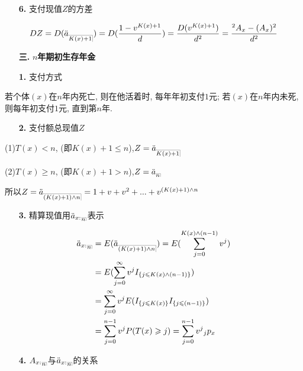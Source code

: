 \documentclass[a4paper,10pt]{ctexbook}
\makeatletter
\newcommand{\hei}{\CJKfamily{hei}}      %
\DeclareRobustCommand{\annu}[1]{_{%
    \def\arraystretch{0}%
    \setlength\arraycolsep{1pt}%
    \setlength\arrayrulewidth{.2pt}%
    \begin{array}[b]{@{}c|}\hline
        \\[\arraycolsep]%
        \scriptstyle #1%
    \end{array}%
}}
\makeatother
\begin{document}
\begin{itemize}
    \item[{\bf\hei 6.}]支付现值$Z$的方差
\end{itemize}

\begin{align*}
    DZ=D(\ddot a_{\annu {K(x)+1}})=D(\frac{1-v^{K(x)+1}}{d})=\frac{D(v^{K(x)+1})}{d^2}=\frac{{}^2A_x-(A_x)^2}{d^2}
\end{align*}

\begin{itemize}
    \item[{\bf\hei 三.}]{\bf\hei $n$年期初生存年金}
\end{itemize}

\begin{itemize}
    \item[{\bf\hei 1.}]支付方式
\end{itemize}

若个体$(x)$在$n$年内死亡, 则在他活着时, 每年年初支付$1$元; 若$(x)$在$n$年内未死, 则每年初支付$1$元, 直到第$n$年.

\begin{itemize}
    \item[{\bf\hei 2.}]支付额总现值$Z$
\end{itemize}

(1)$T(x)<n$, (即$K(x)+1\leqslant n$),$Z=\ddot a_{\annu {K(x)+1}}$

(2)$T(x)\geqslant n$, (即$K(x)+1>n$),$Z=\ddot a_{\annu {n}}$

所以$Z=\ddot a_{\annu {(K(x)+1)\land n}}=1+v+v^2+...+v^{(K(x)+1)\land n}$
\begin{itemize}
    \item[{\bf\hei 3.}]精算现值用$\ddot a_{x:}{}_{\annu n}$表示
\end{itemize}
\begin{align*}
    \ddot a_{x:}{}_{\annu n} & = E(\ddot a_{\annu {(K(x)+1)\land n}})=E(\sum_{j=0}^{K(x)\land (n-1)}{v^j}) \\
                             & =E(\sum_{j=0}^{\infty}{v^j}I_{\{j\leqslant K(x)\land(n-1)\}})               \\
                             & =\sum_{j=0}^{\infty}{v^j}E(I_{\{j\leqslant K(x)\}}I_{\{j\leqslant (n-1)\}}) \\
                             & =\sum_{j=0}^{n-1}{v^j}P(T(x)\geqslant j)=\sum_{j=0}^{n-1}{v^j}{}_j p_x      \\
\end{align*}

\begin{itemize}
    \item[{\bf\hei 4.}]$A_{x:}{}_{\annu n}$与$\ddot a_{x:}{}_{\annu n}$的关系
\end{itemize}
\end{document}

